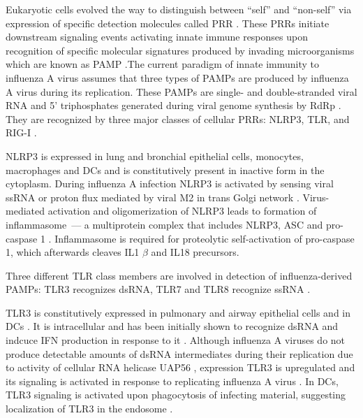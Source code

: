 		Eukaryotic cells evolved the way to distinguish between ``self'' and ``non-self'' via expression of specific detection molecules called \gls{PRR} \parencite{Janeway2002}. These \gls{PRR}s initiate downstream signaling events activating innate immune responses upon recognition of specific molecular signatures produced by invading microorganisms which are known as \gls{PAMP} \parencite{Janeway1989}.The current paradigm of innate immunity to influenza A virus assumes that three types of \gls{PAMP}s are produced by influenza A virus during its replication. These \gls{PAMP}s are single- and double-stranded viral RNA and 5' triphosphates generated during viral genome synthesis by \gls{RdRp} \parencite{Guillot2005, Hornung2006, Kato2006, Lund2004}. They are recognized by three major classes of cellular \gls{PRR}s: \gls{NLRP3}, \gls{TLR}, and \gls{RIG-I} \parencite{Iwasaki2014}.
		
		\gls{NLRP3} is expressed in lung and bronchial epithelial cells, monocytes, macrophages and \gls{DC}s \parencite{Guarda2011, Kim2014} and is constitutively present in inactive form in the cytoplasm. During influenza A infection \gls{NLRP3} is activated by sensing viral \gls{ssRNA} or proton flux mediated by viral \gls{M2} in trans Golgi network \parencite{Thomas2009, Ichinohe2010, Allen2009}. Virus-mediated activation and oligomerization of \gls{NLRP3} leads to formation of inflammasome~--- a multiprotein complex that includes \gls{NLRP3}, \gls{ASC} and pro-caspase 1 \parencite{Tschopp2010}. Inflammasome is required for proteolytic self-activation of pro-caspase 1, which afterwards cleaves IL1 $\beta$ and IL18 precursors.
		
		Three different \gls{TLR} class members are involved in detection of influenza-derived \gls{PAMP}s: \gls{TLR}3 recognizes dsRNA, \gls{TLR}7 and \gls{TLR}8 recognize ssRNA \parencite{Iwasaki2014}. 
		
		\gls{TLR}3 is constitutively expressed in pulmonary and airway epithelial  cells and in \gls{DC}s \parencite{Guillot2005, Schulz2005, Ioannidis2013}. It is intracellular and has been initially shown to recognize dsRNA and indcuce \gls{IFN} production in response to it \parencite{Alexopoulou2001, Guillot2005}. Although influenza A viruses do not produce detectable amounts of dsRNA intermediates during their replication due to activity of cellular RNA helicase UAP56 \parencite{Wisskirchen2011}, expression \gls{TLR}3 is upregulated and its signaling is activated in response to replicating influenza A virus \parencite{Guillot2005}. In \gls{DC}s, \gls{TLR}3 signaling is activated upon phagocytosis of infecting material, suggesting localization of \gls{TLR}3 in the endosome \parencite{Schulz2005}. 
				
